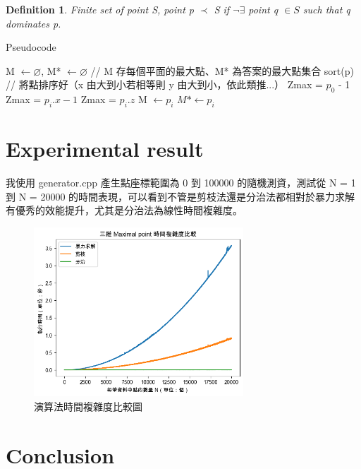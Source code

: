 \documentclass[12pt]{article}
\newtheorem{definition}{Definition}
\begin{document}
\begin{definition}
	Finite set of point S, point p $\prec$ S if $\neg \exists$ point q $\in S$ such that q dominates p.
\end{definition}

\begin{algorithm}[H]
	\caption{Pseudocode}
	\begin{algorithmic}
		\State M $\leftarrow \varnothing$, M* $\leftarrow \varnothing$ // M 存每個平面的最大點、M* 為答案的最大點集合
		\State sort(p) // 將點排序好（x 由大到小若相等則 y 由大到小，依此類推...）
		\State Zmax = $p_0$ - 1 
				\State Zmax = $p_i.x -1$
			\EndIf
				\State Zmax = $p_i.z$
				\State M $\leftarrow p_i$
			\EndIf
		\EndFor
				\State $M* \leftarrow p_i$
			\EndIf
		\EndFor
	\end{algorithmic}
\end{algorithm}
\part{Experimental result}
我使用 generator.cpp 產生點座標範圍為 0 到 100000 的隨機測資，測試從 N = 1 到 N = 20000 的時間表現，可以看到不管是剪枝法還是分治法都相對於暴力求解有優秀的效能提升，尤其是分治法為線性時間複雜度。

\begin{figure}[H]
	\centering
	\includegraphics[width=0.7\textwidth]{time_compare}
	\caption{演算法時間複雜度比較圖} %
	\label{Fig.main2} %
\end{figure}

\part{Conclusion}
\end{document}
